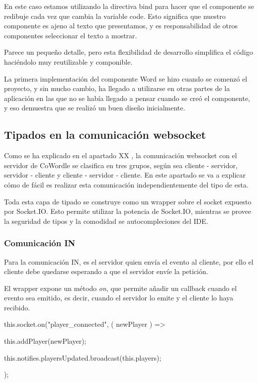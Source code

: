 En este caso estamos utilizando la directiva bind para hacer que el componente se redibuje cada vez que cambia la variable code. Esto significa que nuestro componente es ajeno al texto que presentamos, y es responsabilidad de otros componentes seleccionar el texto a mostrar.

Parece un pequeño detalle, pero esta flexibilidad de desarrollo simplifica el código haciéndolo muy reutilizable y componible.

La primera implementación del componente Word se hizo cuando se comenzó el proyecto,  y sin mucho cambio, ha llegado a utilizarse en otras partes de la aplicación en las que no se había llegado a pensar cuando se creó el componente, y eso demuestra que se realizó un buen diseño inicialmente.

\subsection{Tipados en la comunicación websocket}
Como se ha explicado en el apartado XX , la comunicación websocket con el servidor de CoWordle se clasifica en tres grupos, según sea cliente - servidor, servidor - cliente y cliente - servidor - cliente. En este apartado se va a explicar cómo de fácil es realizar esta comunicación independientemente del tipo de esta.

Toda esta capa de tipado se construye como un wrapper sobre el socket expuesto por Socket.IO. Esto permite utilizar la potencia de Socket.IO, mientras se provee la seguridad de tipos y la comodidad se autocompleciones  del IDE.


\subsubsection{Comunicación IN}
Para la comunicación IN, es el servidor quien envía el evento al cliente, por ello el cliente debe quedarse esperando a que el servidor envíe la petición.

El wrapper expone un método \textit{on}, que permite añadir un callback cuando el evento sea emitido, es decir, cuando el servidor lo emite y el cliente lo haya recibido.

\begin{mytypescript}[float={!h},caption={Uso de eventos websocket IN.},label={alg:ws_in_usage}]
	this.socket.on("player_connected", ({ newPlayer }) => {
		this.addPlayer(newPlayer);
																								
		this.notifies.playersUpdated.broadcast(this.players);
	}); 
\end{mytypescript}


